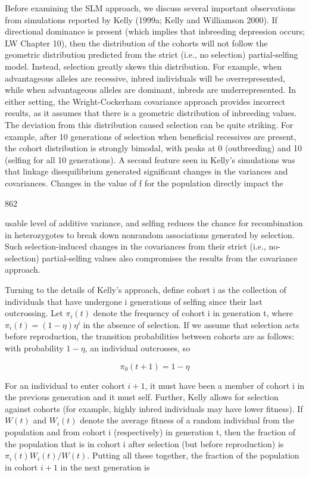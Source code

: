 \documentclass{article}
\begin{document}
Before examining the SLM approach, we discuss several important observations from simulations reported by Kelly (1999a; Kelly and Williamson 2000). If directional dominance is present (which implies that inbreeding depression occurs; LW Chapter 10), then the distribution of the cohorts will not follow the geometric distribution predicted from the strict (i.e., no selection) partial-selfing model. Instead, selection greatly skews this distribution. For example, when advantageous alleles are recessive, inbred individuals will be overrepresented, while when advantageous alleles are dominant, inbreds are underrepresented. In either setting, the Wright-Cockerham covariance approach provides incorrect results, as it assumes that there is a geometric distribution of inbreeding values. The deviation from this distribution caused selection can be quite striking. For example, after 10 generations of selection when beneficial recessives are present, the cohort distribution is strongly bimodal, with peaks at 0 (outbreeding) and 10 (selfing for all 10 generations). A second feature seen in Kelly's simulations was that linkage disequilibrium generated significant changes in the variances and covariances. Changes in the value of f for the population directly impact the

862

usable level of additive variance, and selfing reduces the chance for recombination in heterozygotes to break down nonrandom associations generated by selection. Such selection-induced changes in the covariances from their strict (i.e., no-selection) partial-selfing values also compromises the results from the covariance approach.

Turning to the details of Kelly’s approach, define cohort i as the collection of individuals that have undergone i generations of selfing since their last outcrossing. Let  $ \pi_i(t) $ denote the frequency of cohort i in generation t, where  $ \pi_i(t) = (1 - \eta)\eta^i $ in the absence of selection. If we assume that selection acts before reproduction, the transition probabilities between cohorts are as follows: with probability  $ 1 - \eta $, an individual outcrosses, so

\begin{equation}
\pi_{0}(t+1)=1-\eta
\tag{23.60a}
\label{eq:23_60a}
\end{equation}

For an individual to enter cohort  $ i+1 $, it must have been a member of cohort i in the previous generation and it must self. Further, Kelly allows for selection against cohorts (for example, highly inbred individuals may have lower fitness). If  $ W(t) $ and  $ W_i(t) $ denote the average fitness of a random individual from the population and from cohort i (respectively) in generation t, then the fraction of the population that is in cohort i after selection (but before reproduction) is  $ \pi_i(t) W_i(t)/W(t) $. Putting all these together, the fraction of the population in cohort  $ i+1 $ in the next generation is
\end{document}
